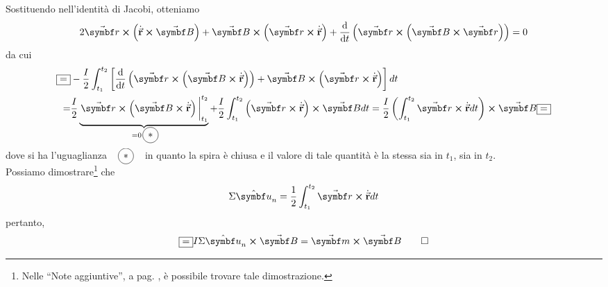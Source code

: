 \begin{demonstration}
	Sostituendo nell'identità di Jacobi, otteniamo
	\begin{equation*}
		2\vba{r}\cross\left(\vbd{r}\cross\vba{B}\right)+\vba{B}\cross\left(\vba{r}\cross\vbd{r}\right)+\dv{t}\left(\vba{r}\cross\left(\vba{B}\cross\vba{r}\right)\right)=0
	\end{equation*}
	da cui
	\begin{align*}
		\squarequal& -\frac{I}{2}\int_{t_1}^{t_2}\left[\dv{t}\left(\vba{r}\cross\left(\vba{B}\cross\vbd{r}\right)\right)+\vba{B}\cross\left(\vba{r}\cross\vbd{r}\right)\right]dt\\
		=&\frac{I}{2}\underbrace{\eval{\vba{r}\cross\left(\vba{B}\cross\vbd{r}\right)}_{t_1}^{t_2}}_{=0\ \circled{\ast}}+\frac{I}{2}\int_{t_1}^{t_2}\left(\vba{r}\cross\vbd{r}\right)\cross\vba{B}dt=\frac{I}{2}\left(\int_{t_1}^{t_2}\vba{r}\cross\vbd{r}dt\right)\cross\vba{B}\squarequal
	\end{align*}
	dove si ha l'uguaglianza $\quad\circled{\ast}\quad$ in quanto la spira è chiusa e il valore di tale quantità è la stessa sia in $t_1$, sia in  $t_2$.\\
	Possiamo dimostrare\footnote{Nelle ``Note aggiuntive'', a pag. \pageref{AreaCurvaDelimitata}, è possibile trovare tale dimostrazione.} che
	\begin{equation*}
		\Sigma\vbh{u}_n=\frac{1}{2}\int_{t_1}^{t_2}\vba{r}\cross\vbd{r}dt
	\end{equation*}
pertanto,
\begin{equation*}
	\squarequal I\Sigma\vbh{u}_n\cross \vba{B}=\vba{m}\cross\vba{B}\qedhere
\end{equation*}
\end{demonstration}
